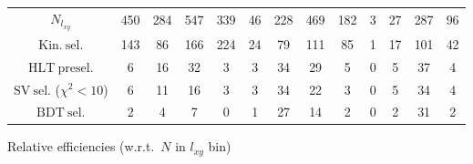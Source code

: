 \documentclass[10pt,a4paper]{article}
\begin{document}
\begin{landscape}
{\begin{tabular}{c|cccc|cccc|cccc}
\midrule
$N_{l_{xy}}$ & 450 & 284 & 547 & 339 & 46 & 228 & 469 & 182 & 3 & 27 & 287 & 96\\
$\mathrm{Kin.\ sel.}$ & 143 & 86 & 166 & 224 & 24 & 79 & 111 & 85 & 1 & 17 & 101 & 42\\
$\mathrm{HLT\ presel.}$ & 6 & 16 & 32 & 3 & 3 & 34 & 29 & 5 & 0 & 5 & 37 & 4\\
$\mathrm{SV\ sel.}$ ($\chi^2{<}10$) & 6 & 11 & 16 & 3 & 3 & 34 & 22 & 3 & 0 & 5 & 34 & 4\\
$\mathrm{BDT\ sel.}$ & 2 & 4 & 7 & 0 & 1 & 27 & 14 & 2 & 0 & 2 & 31 & 2\\
\bottomrule
\end{tabular}}

\vspace{18pt}

Relative efficiencies (w.r.t.\ $N$ in $l_{xy}$ bin)


\end{landscape}
\end{document}
